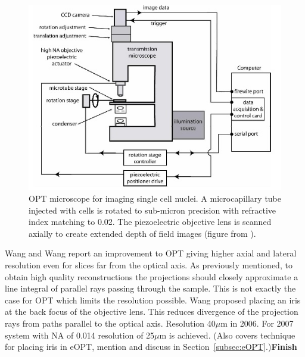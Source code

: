 \documentclass[12pt]{article}
\begin{document}



\begin{figure}[H]
\centering
\includegraphics[scale=0.8]{Fauver_2005_setup.jpg}
\caption{OPT microscope for imaging single cell nuclei. A microcapillary tube injected with cells is rotated to sub-micron precision with refractive index matching  to 0.02. The piezoelectric objective lens is scanned axially to create extended depth of field images (figure from \cite{Fauver:2005}).}
\label{fig:fauver_setup}
\end{figure}







Wang and Wang report an improvement to OPT giving higher axial and lateral resolution even for slices far from the optical axis. \cite{Wang:2006hy, Wang:2007} As previously mentioned, to obtain high quality reconstructions the projections should closely approximate a line integral of parallel rays passing through the sample. \cite{Wang:2006hy} This is not exactly the case for  OPT which limits the resolution possible. Wang proposed placing an iris at the back focus of the objective lens. This reduces divergence of the projection rays from paths parallel to the optical axis.
Resolution 40$\mu$m in 2006. For 2007 system with NA of 0.014 resolution of 25$\mu$m is achieved.
(Also covers technique for placing iris in eOPT, mention and discuss in Section~\ref{subsec:eOPT}.)\textbf{Finish}
\end{document}
